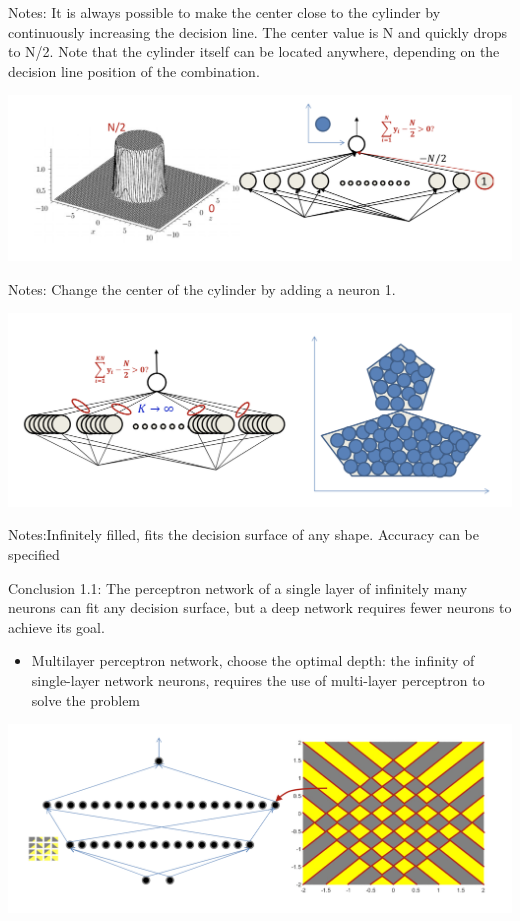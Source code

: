 \documentclass{article}
\begin{document}
	Notes: It is always possible to make the center close to the cylinder by continuously increasing the decision line. The center value is N and quickly drops to N/2. Note that the cylinder itself can be located anywhere, depending on the decision line position of the combination.
	
	\includegraphics[scale=0.2]{29.png}
	
	Notes: Change the center of the cylinder by adding a neuron 1.
	
	\includegraphics[scale=0.2]{30.png}
	
	Notes:Infinitely filled, fits the decision surface of any shape. Accuracy can be specified
	
	Conclusion 1.1: The perceptron network of a single layer of infinitely many neurons can fit any decision surface, but a deep network requires fewer neurons to achieve its goal.
	
	
	\begin{itemize}
		\item Multilayer perceptron network, choose the optimal depth: the infinity of single-layer network neurons, requires the use of multi-layer perceptron to solve the problem
	\end{itemize}
	
	\includegraphics[scale=0.2]{31.png}
	
\end{document}
